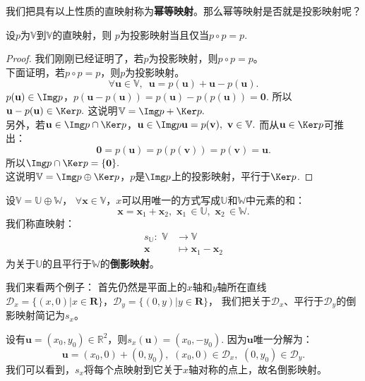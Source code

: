 \documentclass[12pt,UTF8]{ctexbook}
\begin{document}
我们把具有以上性质的直映射称为\textbf{幂等映射}。那么幂等映射是否就是投影映射呢？
\begin{pp}\label{pp:3_4}
    设$p$为$\mathbb{V}$到$\mathbb{V}$的直映射，则
    $p$为投影映射当且仅当$p\circ p = p.$
\end{pp}
\begin{proof} %
    我们刚刚已经证明了，若$p$为投影映射，则$p\circ p = p$。\\
    下面证明，若$p\circ p = p$，则$p$为投影映射。\\
    $$\forall \mathbf{u}\in\mathbb{V}, \,\,\, \mathbf{u} = p(\mathbf{u}) + \mathbf{u} - p(\mathbf{u}).$$
    $p(\mathbf{u})\in\Img p$，$p(\mathbf{u} - p(\mathbf{u})) = p(\mathbf{u}) - p(p(\mathbf{u})) = \mathbf{0}.$
    所以$\mathbf{u} - p(\mathbf{u})\in\Ker p.$
    这说明$\mathbb{V}=\Img p + \Ker p.$\\
    另外，若$\mathbf{u} \in \Img p \cap \Ker p$，$\mathbf{u} \in \Img p\mathbf{u} = p(\mathbf{v}), \,\,\mathbf{v}\in\mathbb{V}.$ 而从$\mathbf{u}\in\Ker p$可推出：
    $$ \mathbf{0} = p(\mathbf{u}) = p(p(\mathbf{v})) = p(\mathbf{v}) = \mathbf{u}.$$
    所以$\Img p \cap \Ker p = \{\mathbf{0}\}.$\\
    这说明$\mathbb{V}=\Img p \oplus \Ker p$，$p$是$\Img p$上的投影映射，平行于$\Ker p$.
\end{proof}


\begin{df}\label{df:3_2_1}
    设$\mathbb{V} = \mathbb{U} \oplus \mathbb{W}$，
    $\forall \mathbf{x}\in \mathbb{V}$，$x$可以用唯一的方式写成$\mathbb{U}$和$\mathbb{W}$中元素的和：
    $$ \mathbf{x} = \mathbf{x}_1 + \mathbf{x}_2, \,\,\mathbf{x}_1\,\in\mathbb{U},\,\,\mathbf{x}_2\,\in\mathbb{W}.$$
    我们称直映射：
    \begin{align*}
        s_{\mathbb{U}}: \,\, \mathbb{V} & \to \mathbb{V}  \\
        \mathbf{x} & \mapsto \mathbf{x}_1 - \mathbf{x}_2 
    \end{align*}    
    为关于$\mathbb{U}$的且平行于$\mathbb{W}$的\textbf{倒影映射}。
\end{df}

我们来看两个例子：
首先仍然是平面上的$x$轴和$y$轴所在直线
$\mathcal{D}_x = \{(x,0)|x\in\mathbf{R}\}$，$\mathcal{D}_y = \{(0,y)|y\in\mathbf{R}\}$，
我们把关于$\mathcal{D}_x$、平行于$\mathcal{D}_y$的倒影映射简记为$s_x$。

设有$\mathbf{u} = (x_0, y_0) \in\mathbb{R}^2$，则$s_x(\mathbf{u}) = (x_0,-y_0)$.
因为$\mathbf{u}$唯一分解为：
$$\mathbf{u} = (x_0,0) + (0,y_0), \,\,(x_0,0)\in\mathcal{D}_x,\,\,(0,y_0)\in\mathcal{D}_y.$$
我们可以看到，$s_x$将每个点映射到它关于$x$轴对称的点上，故名倒影映射。
\end{document}
